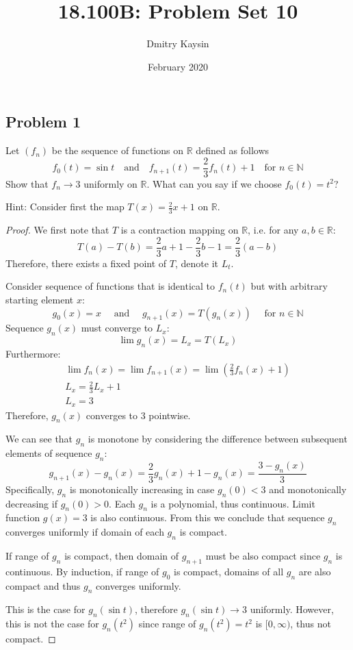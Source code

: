 \documentclass{article}
\title{18.100B: Problem Set 10}
\author{Dmitry Kaysin}
\date{February 2020}
\newcommand{\R}{\mathbb{R}}
\newcommand{\N}{\mathbb{N}}
\begin{document}
\maketitle 


\subsection*{Problem 1}

\begin{tcolorbox}
Let $(f_n)$ be the sequence of functions on $\R$ defined as follows
\[ f_0(t) = \sin t \>\>\> \text{ and } \>\>\> f_{n+1}(t) = \frac{2}{3}f_n(t)+1 \>\>\> \text{ for $n \in \N$} \]
Show that $f_n \to 3$ uniformly on $\R$. What can you say if we choose $f_0(t) = t^2$?

Hint: Consider first the map $T(x) = \frac{2}{3}x + 1$ on $\R$.
\end{tcolorbox}

\begin{proof}

We first note that $T$ is a contraction mapping on $\R$, i.e. for any $a,b \in \R$:
\[ T(a) - T(b) = \frac{2}{3}a+1 - \frac{2}{3}b-1 = \frac{2}{3}(a-b) \]
Therefore, there exists a fixed point of $T$, denote it $L_t$.

Consider sequence of functions that is identical to $f_n(t)$ but with arbitrary starting element $x$:
\[ g_0(x) = x \quad \text{ and } \quad g_{n+1}(x) = T(g_n(x)) \quad \text{ for $n \in \N$} \]
Sequence $g_n(x)$ must converge to $L_x$:
\[ \lim g_n(x) = L_x = T(L_x) \]
Furthermore:
\begin{gather*}
    \lim f_{n}(x) = \lim f_{n+1}(x) = \lim \left( \frac{2}{3}f_n(x)+1 \right) \\
    L_x = \frac{2}{3} L_x +1 \\
    L_x = 3    
\end{gather*}
Therefore, $g_n(x)$ converges to $3$ pointwise.

We can see that $g_n$ is monotone by considering the difference between subsequent elements of sequence $g_n$:
\[ g_{n+1}(x) - g_n(x) = \frac{2}{3}g_n(x) + 1 - g_n(x) = \frac{3-g_n(x)}{3} \]
Specifically, $g_n$ is monotonically increasing in case $g_n(0) < 3$ and monotonically decreasing if $g_n(0) > 0$.
Each $g_n$ is a polynomial, thus continuous.
Limit function $g(x)=3$ is also continuous.
From this we conclude that sequence $g_n$ converges uniformly if domain of each $g_n$ is compact.

If range of $g_n$ is compact, then domain of $g_{n+1}$ must be also compact since $g_n$ is continuous.
By induction, if range of $g_0$ is compact, domains of all $g_n$ are also compact and thus $g_n$ converges uniformly.

This is the case for $g_n(\sin t)$, therefore $g_n(\sin t) \to 3$ uniformly.
However, this is not the case for $g_n(t^2)$ since range of $g_n(t^2) = t^2$ is $[0,\infty)$, thus not compact.

\end{proof}
\end{document}
